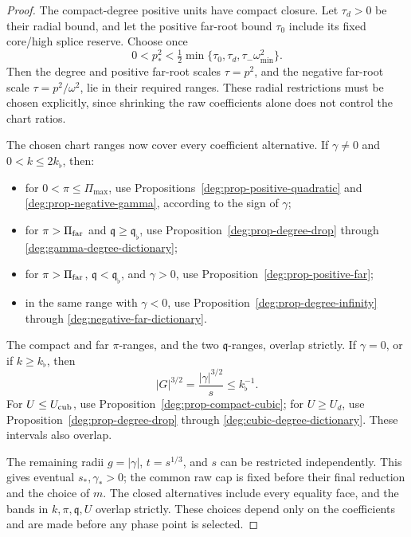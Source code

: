 \begin{proof}
The compact-degree positive units have compact closure. Let
\(\tau_d>0\) be their radial bound, and let the positive far-root
bound \(\tau_0\) include its fixed core/high splice reserve. Choose once
\begin{equation}\label{deg:small-ratio-choice}
 0<p_*^2<\tfrac12\min\{\tau_0,\tau_d,
                                  \tau_-\omega_{\min}^2\}.
\end{equation}
Then the degree and positive far-root scales \(\tau=p^2\), and the
negative far-root scale \(\tau=p^2/\omega^2\), lie in their required
ranges. These radial restrictions must be chosen explicitly, since shrinking
the raw coefficients alone does not control the chart ratios.

The chosen chart ranges now cover every coefficient alternative. If \(\gamma\ne0\) and
\(0<k\le2k_\flat\), then:
\begin{itemize}
 \item for \(0<\pi\le\Pi_{\max}\), use
 Propositions~\ref{deg:prop-positive-quadratic} and
 \ref{deg:prop-negative-gamma}, according to the sign of \(\gamma\);
 \item for \(\pi>\Pi_{\rm far}\) and \(\mathfrak q\ge \mathfrak q_\flat\), use
 Proposition~\ref{deg:prop-degree-drop} through
 \eqref{deg:gamma-degree-dictionary};
 \item for \(\pi>\Pi_{\rm far}\), \(\mathfrak q<\mathfrak q_\flat\), and \(\gamma>0\),
 use Proposition~\ref{deg:prop-positive-far};
 \item in the same range with \(\gamma<0\), use
 Proposition~\ref{deg:prop-degree-infinity} through
 \eqref{deg:negative-far-dictionary}.
\end{itemize}
The compact and far \(\pi\)-ranges, and the two \(\mathfrak q\)-ranges, overlap
strictly.  If \(\gamma=0\), or if \(k\ge k_\flat\), then
\[
 |G|^{3/2}=\frac{|\gamma|^{3/2}}{s}\le k_\flat^{-1}.
\]
For \(U\le U_{\rm cub}\), use
Proposition~\ref{deg:prop-compact-cubic}; for \(U\ge U_d\), use
Proposition~\ref{deg:prop-degree-drop} through
\eqref{deg:cubic-degree-dictionary}.  These intervals also overlap.

The remaining radii \(g=|\gamma|\), \(t=s^{1/3}\), and \(s\)
can be restricted independently. This gives eventual \(s_*,\gamma_*>0\);
the common raw cap is fixed before their final reduction and the choice
of \(m\). The closed alternatives include every equality face, and the bands in \(k,\pi,\mathfrak q,U\) overlap strictly. These choices depend only on the coefficients and are made before any
phase point is selected.
\end{proof}

